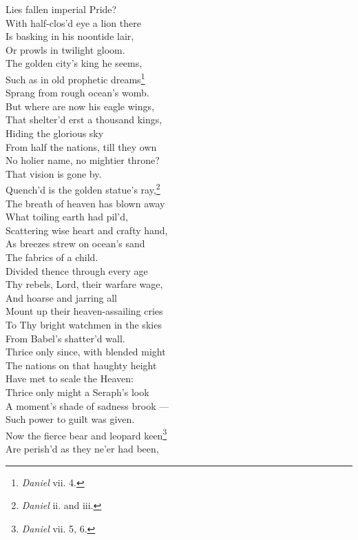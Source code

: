  Lies fallen imperial Pride? \\
  With half-clos’d eye a lion there \\
 Is basking in his noontide lair, \\
 Or prowls in twilight gloom. \\
 The golden city’s king he seems, \\
 Such as in old prophetic dreams\footnote{\emph{Daniel} vii. 4.} \\
 Sprang from rough ocean’s womb. \\
  But where are now his eagle wings, \\
 That shelter’d erst a thousand kings, \\
 Hiding the glorious sky \\
 From half the nations, till they own \\
 No holier name, no mightier throne? \\
 That vision is gone by. \\
  Quench’d is the golden statue’s ray,\footnote{\emph{Daniel} ii. and iii.} \\
 The breath of heaven has blown away \\
 What toiling earth had pil’d, \\
 Scattering wise heart and crafty hand, \\
 As breezes strew on ocean’s sand \\
 The fabrics of a child. \\
  Divided thence through every age \\
 Thy rebels, Lord, their warfare wage, \\
 And hoarse and jarring all \\
 Mount up their heaven-assailing cries \\
 To Thy bright watchmen in the skies \\
 From Babel’s shatter’d wall. \\
  Thrice only since, with blended might \\
 The nations on that haughty height \\
 Have met to scale the Heaven: \\
 Thrice only might a Seraph’s look \\
 A moment’s shade of sadness brook — \\
 Such power to guilt was given. \\
  Now the fierce bear and leopard keen\footnote{\emph{Daniel} vii. 5, 6.} \\
 Are perish’d as they ne’er had been, \\
